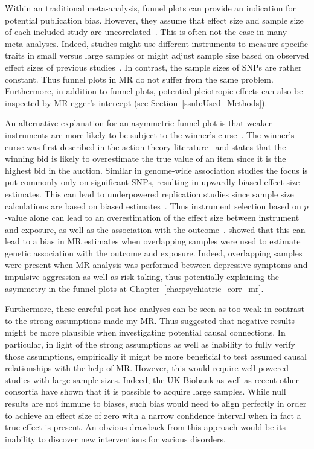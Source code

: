 Within an traditional meta-analysis, funnel plots can provide an indication for potential publication bias.
However, they assume that effect size and sample size of each included study are uncorrelated~\cite{Evans2013}.
This is often not the case in many meta-analyses.
Indeed, studies might use different instruments to measure specific traits in small versus large samples or  might adjust sample size based on observed effect sizes of previous studies~\cite{Simonsohn}.
In contrast, the sample sizes of SNPs are rather constant.
Thus funnel plots in MR do not suffer from the same problem.
Furthermore, in addition to funnel plots, potential pleiotropic effects can also be inspected by MR-egger's intercept (see Section~\ref{ssub:Used_Methods}).

An alternative explanation for an asymmetric funnel plot is that weaker instruments are more likely to be subject to the winner's curse~\cite{Taylor2014}.
The winner's curse was first described in the action theory literature~\cite{Bazerman1983} and states that the winning bid is likely to overestimate the true value of an item since it is the highest bid in the auction.
Similar in genome-wide association studies the focus is put commonly only  on significant SNPs, resulting in upwardly-biased effect size estimates.
This can lead to underpowered replication studies since sample size calculations are based on biased estimates~\cite{Xiao2008}.
Thus instrument selection based on $p$-value alone can lead to an overestimation of the effect size between instrument and exposure, as well as  the association with the outcome~\cite{Bowden2015a,Taylor2014}.
\citet{Burgess2016c} showed that this can lead to a bias in MR estimates when overlapping samples were used to estimate genetic association with the outcome and exposure.
Indeed, overlapping samples were present when MR analysis was performed between depressive symptoms and impulsive aggression as well as risk taking,
thus potentially explaining the asymmetry in the funnel plots at Chapter~\ref{cha:psychiatric_corr_mr}.

Furthermore, these careful post-hoc analyses can be seen as too weak in contrast to the strong assumptions made my MR\@. 
Thus \citet{Vanderweele2015} suggested that negative results might be more plausible when investigating potential causal connections.
In particular, in light of the strong assumptions as well as inability to fully verify those assumptions, empirically it might be more beneficial to test assumed causal relationships with the help of MR\@.
However, this would require well-powered studies with large sample sizes.
Indeed, the UK Biobank as well as recent other consortia have shown that it is possible to acquire large samples.
While null results are not immune to biases, such bias would need to align perfectly in order to achieve an effect size of zero with a narrow confidence interval when in fact a true effect is present.
An obvious drawback from this approach would be its inability to discover new interventions for various disorders. 

